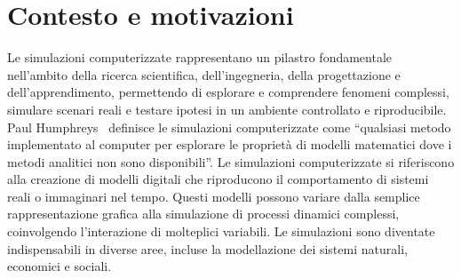 \documentclass[12pt,a4paper,openright,twoside]{book}
\begin{document}
\section{Contesto e motivazioni}
Le simulazioni computerizzate rappresentano un pilastro fondamentale nell'ambito della ricerca scientifica, dell'ingegneria, della progettazione e dell'apprendimento, permettendo di esplorare e comprendere fenomeni complessi, simulare scenari reali e testare ipotesi in un ambiente controllato e riproducibile. 
Paul Humphreys~\cite{Humphreys1990-HUMCS} definisce le simulazioni computerizzate come ``qualsiasi metodo implementato al computer per esplorare le proprietà di modelli matematici dove i metodi analitici non sono disponibili''. 
Le simulazioni computerizzate si riferiscono alla creazione di modelli digitali che riproducono il comportamento di sistemi reali o immaginari nel tempo. Questi modelli possono variare dalla semplice rappresentazione grafica alla simulazione di processi dinamici complessi, coinvolgendo l'interazione di molteplici variabili. 
Le simulazioni sono diventate indispensabili in diverse aree, incluse la modellazione dei sistemi naturali, economici e sociali. 
\end{document}
